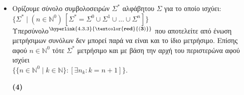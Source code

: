 \begin{tcolorbox}[colback=yellow!15!white, colframe=blue!50!white,
	fonttitle=\bfseries\Large, title = Απόδειξη - μέρος 1/2]
\begin{itemize}
	\item Ορίζουμε σύνολο συμβολοσειρών $\Sigma^*$ αλφάβητου $\Sigma$ για το οποίο ισχύει:\\
	$\{ \Sigma^* \;\vert\; (n \in \mathbb{N}^0)\,[\Sigma^* = \Sigma^0 \cup \Sigma^1 \cup ... \cup \Sigma^n] \}$ \\
	Υπερσύνολο$^{\hyperlink{4.3.3}{\bf{\textcolor{red}{(3)}}}}$ που αποτελείτε από ένωση μετρήσιμων
	συνόλων δεν μπορεί παρά να είναι και το
	ίδιο μετρήσιμο. Επίσης αφού $n \in \mathbb{N}^0$ τότε $\Sigma^*$ μετρήσιμο και με βάση την αρχή του
	περιστερώνα αφού ισχύει\\
	 $\{\{n \in \mathbb{N}^0 \;\vert\; k \in \mathbb{N}\}:[\exists n_k : k = n+1]\}$.
	 \reducevspace\reducevspace\reducevspace\reducevspace\reducevspace\reducevspace\reducevspace
	 \reducevspace\reducevspace\reducevspace\reducevspace\reducevspace\reducevspace\reducevspace
	 \begin{flushright}\hypertarget{4.3.4}{\bf{(4)}}\end{flushright}

\end{itemize}
\end{tcolorbox}


